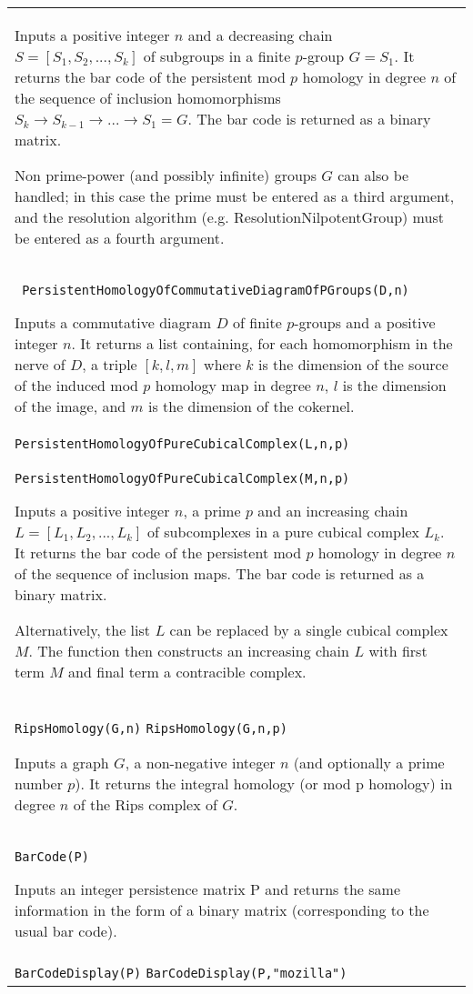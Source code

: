\documentclass[a4paper,11pt]{report}
\begin{document}
{\begin{center}
\begin{tabular}{|l|}
 Inputs a positive integer $n$ and a decreasing chain $S=[S_1, S_2, ..., S_k]$ of subgroups in a finite $p$-group $G=S_1$. It returns the bar code of the persistent mod $p$ homology in degree $n$ of the sequence of inclusion homomorphisms $S_k \rightarrow S_{k-1} \rightarrow ... \rightarrow S_1=G $. The bar code is returned as a binary matrix. 

 Non prime-power (and possibly infinite) groups $G$ can also be handled; in this case the prime must be entered as a third
argument, and the resolution algorithm (e.g. ResolutionNilpotentGroup) must be
entered as a fourth argument. \\
 \texttt{ PersistentHomologyOfCommutativeDiagramOfPGroups(D,n) } 

 Inputs a commutative diagram $D$ of finite $p$-groups and a positive integer $n$. It returns a list containing, for each homomorphism in the nerve of $D$, a triple $[k,l,m]$ where $k$ is the dimension of the source of the induced mod $p$ homology map in degree $n$, $l$ is the dimension of the image, and $m$ is the dimension of the cokernel. \\
 \index{PersistentHomologyOfPureCubicalComplex} \texttt{PersistentHomologyOfPureCubicalComplex(L,n,p)} \\
 \texttt{PersistentHomologyOfPureCubicalComplex(M,n,p)} 

 Inputs a positive integer $n$, a prime $p$ and an increasing chain $L=[L_1, L_2, ..., L_k]$ of subcomplexes in a pure cubical complex $L_k$. It returns the bar code of the persistent mod $p$ homology in degree $n$ of the sequence of inclusion maps. The bar code is returned as a binary
matrix. 

 Alternatively, the list $L$ can be replaced by a single cubical complex $M$. The function then constructs an increasing chain $L$ with first term $M$ and final term a contracible complex. \\
 \index{RipsHomology} \texttt{RipsHomology(G,n)} \texttt{RipsHomology(G,n,p)} 

 Inputs a graph $G$, a non-negative integer $n$ (and optionally a prime number $p$). It returns the integral homology (or mod p homology) in degree $n$ of the Rips complex of $G$. \\
 \index{BarCode} \texttt{BarCode(P)} 

 Inputs an integer persistence matrix P and returns the same information in the
form of a binary matrix (corresponding to the usual bar code). \\
 \index{BarCodeDisplay} \texttt{BarCodeDisplay(P)} \texttt{BarCodeDisplay(P,"mozilla")} 


\end{tabular}
\end{center}}
\end{document}
